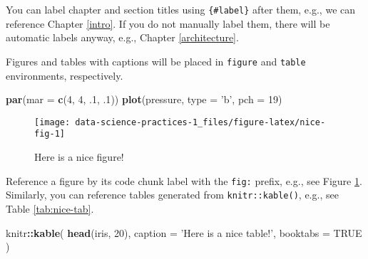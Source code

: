 \documentclass[]{book}
\newenvironment{Shaded}{\begin{snugshade}}{\end{snugshade}}
\newcommand{\DataTypeTok}[1]{\textcolor[rgb]{0.13,0.29,0.53}{#1}}
\newcommand{\DecValTok}[1]{\textcolor[rgb]{0.00,0.00,0.81}{#1}}
\newcommand{\FloatTok}[1]{\textcolor[rgb]{0.00,0.00,0.81}{#1}}
\newcommand{\KeywordTok}[1]{\textcolor[rgb]{0.13,0.29,0.53}{\textbf{#1}}}
\newcommand{\NormalTok}[1]{#1}
\newcommand{\OperatorTok}[1]{\textcolor[rgb]{0.81,0.36,0.00}{\textbf{#1}}}
\newcommand{\OtherTok}[1]{\textcolor[rgb]{0.56,0.35,0.01}{#1}}
\newcommand{\StringTok}[1]{\textcolor[rgb]{0.31,0.60,0.02}{#1}}
\begin{document}
You can label chapter and section titles using \texttt{\{\#label\}} after them, e.g., we can reference Chapter \ref{intro}. If you do not manually label them, there will be automatic labels anyway, e.g., Chapter \ref{architecture}.

Figures and tables with captions will be placed in \texttt{figure} and \texttt{table} environments, respectively.

\begin{Shaded}
\begin{Highlighting}[]
\KeywordTok{par}\NormalTok{(}\DataTypeTok{mar =} \KeywordTok{c}\NormalTok{(}\DecValTok{4}\NormalTok{, }\DecValTok{4}\NormalTok{, }\FloatTok{.1}\NormalTok{, }\FloatTok{.1}\NormalTok{))}
\KeywordTok{plot}\NormalTok{(pressure, }\DataTypeTok{type =} \StringTok{'b'}\NormalTok{, }\DataTypeTok{pch =} \DecValTok{19}\NormalTok{)}
\end{Highlighting}
\end{Shaded}

\begin{figure}

{\centering \texttt{[image: data-science-practices-1\_files/figure-latex/nice-fig-1]} 

}

\caption{Here is a nice figure!}\label{fig:nice-fig}
\end{figure}

Reference a figure by its code chunk label with the \texttt{fig:} prefix, e.g., see Figure \ref{fig:nice-fig}. Similarly, you can reference tables generated from \texttt{knitr::kable()}, e.g., see Table \ref{tab:nice-tab}.

\begin{Shaded}
\begin{Highlighting}[]
\NormalTok{knitr}\OperatorTok{::}\KeywordTok{kable}\NormalTok{(}
  \KeywordTok{head}\NormalTok{(iris, }\DecValTok{20}\NormalTok{), }\DataTypeTok{caption =} \StringTok{'Here is a nice table!'}\NormalTok{,}
  \DataTypeTok{booktabs =} \OtherTok{TRUE}
\NormalTok{)}
\end{Highlighting}
\end{Shaded}
\end{document}
